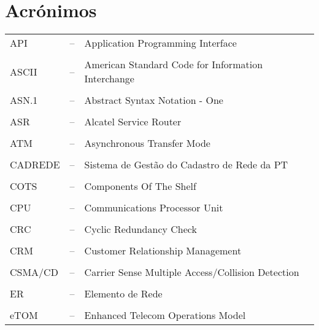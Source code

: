 \label{Acronym}
\section*{Acrónimos}
\vspace{1cm}
\begin{tabular}{ l c l }
	API	& –	\hspace{1cm} & Application Programming Interface \\
	\\
	ASCII & – \hspace{1cm} &	American Standard Code for Information Interchange \\
	\\
	ASN.1 & – \hspace{1cm} & Abstract Syntax Notation - One \\
	\\
	ASR & –	\hspace{1cm} & Alcatel Service Router \\
	\\
	ATM & – \hspace{1cm} & Asynchronous Transfer Mode \\
	\\
	CADREDE & –	\hspace{1cm} & Sistema de Gestão do Cadastro de Rede da PT \\
	\\
	COTS & – \hspace{1cm} &Components Of The Shelf \\
	\\
	CPU	& – \hspace{1cm} & Communications Processor Unit \\
	\\
	CRC & – \hspace{1cm} & Cyclic Redundancy Check \\
	\\
	CRM & – \hspace{1cm} & Customer Relationship Management \\
	\\
	CSMA/CD & – \hspace{1cm} & Carrier Sense Multiple Access/Collision Detection \\
	\\
	ER & – \hspace{1cm} & Elemento de Rede \\
	\\
	eTOM & – \hspace{1cm} & Enhanced Telecom Operations Model \\

\end{tabular}
